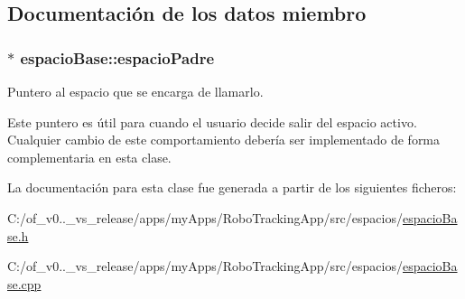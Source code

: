 \subsection{Documentación de los datos miembro}
\hypertarget{classespacio_base_aa0d870b94bfc801da7bd3015fb9ce847}{}
\subsubsection[{espacio\+Padre}]{$\ast$ espacio\+Base\+::espacio\+Padre\hspace{0.3cm}{\ttfamily [protected]}}\label{classespacio_base_aa0d870b94bfc801da7bd3015fb9ce847}


Puntero al espacio que se encarga de llamarlo. 

Este puntero es útil para cuando el usuario decide salir del espacio activo. Cualquier cambio de este comportamiento debería ser implementado de forma complementaria en esta clase. 

La documentación para esta clase fue generada a partir de los siguientes ficheros\+:\begin{DoxyCompactItemize}
\item 
C\+:/of\+\_\+v0..\+\_\+vs\+\_\+release/apps/my\+Apps/\+Robo\+Tracking\+App/src/espacios/\hyperlink{espacio_base_8h}{espacio\+Base.\+h}\item 
C\+:/of\+\_\+v0..\+\_\+vs\+\_\+release/apps/my\+Apps/\+Robo\+Tracking\+App/src/espacios/\hyperlink{espacio_base_8cpp}{espacio\+Base.\+cpp}\end{DoxyCompactItemize}

